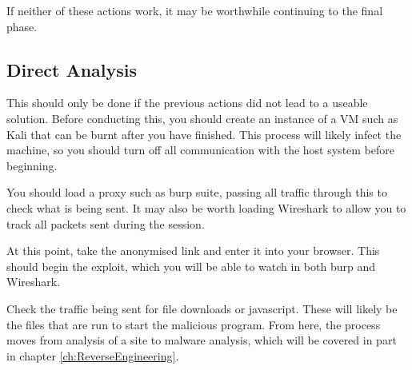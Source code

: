 			If neither of these actions work, it may be worthwhile continuing to the final phase. 

		\subsection{Direct Analysis}
			This should only be done if the previous actions did not lead to a useable solution. 
			Before conducting this, you should create an instance of a VM such as Kali that can be burnt after you have finished. 
			This process will likely infect the machine, so you should turn off all communication with the host system before beginning. 

			You should load a proxy such as burp suite, passing all traffic through this to check what is being sent. 
			It may also be worth loading Wireshark to allow you to track all packets sent during the session. 

			At this point, take the anonymised link and enter it into your browser. 
			This should begin the exploit, which you will be able to watch in both burp and Wireshark. 

			Check the traffic being sent for file downloads or javascript. 
			These will likely be the files that are run to start the malicious program. 
			From here, the process moves from analysis of a site to malware analysis, which will be covered in part in chapter \ref{ch:ReverseEngineering}.
